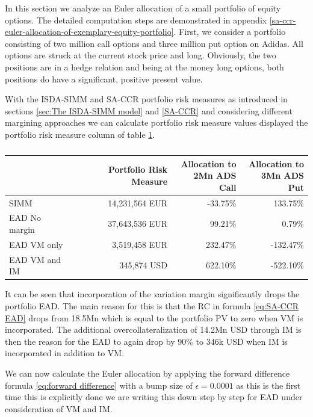 \documentclass[../Thesis_AHoecherl.tex]{subfiles}
\begin{document}
    In this section we analyze an Euler allocation of a small portfolio of equity options. The detailed computation steps are demonstrated in appendix \ref{sa-ccr-euler-allocation-of-exemplary-equity-portfolio}. 
    First, we consider a portfolio consisting of two million call options and three million put option on Adidas. All options are struck at the current stock price and long. Obviously, the two positions are in a hedge relation and being at the money long options, both positions do have a significant, positive present value.
    
    With the ISDA-SIMM and SA-CCR portfolio risk measures as introduced in sections \ref{sec:The ISDA-SIMM model} and \ref{SA-CCR} and considering different margining approaches we can calculate portfolio risk measure values displayed the portfolio risk measure column of table \ref{tab:2TradeEquityResults}.
    \begin{table}[htbp]
        \centering
        \begin{tabular}{l||r|r|r}
            & Portfolio Risk Measure & \makecell{Allocation to \\ 2Mn ADS Call} & \makecell{Allocation to \\ 3Mn ADS Put} \\
                \toprule
        SIMM  & 14,231,564 EUR & -33.75\% & 133.75\%  \\
        EAD No margin & 37,643,536 EUR & 99.21\% & 0.79\%  \\
        EAD VM only & 3,519,458 EUR & 232.47\% & -132.47\%  \\
        EAD VM and IM & 345,874 USD  & 622.10\% & -522.10\% \\
        \end{tabular}%
        \caption{}
        \label{tab:2TradeEquityResults}%
    \end{table}%
    It can be seen that incorporation of the variation margin significantly drops the portfolio EAD. The main reason for this is that the RC in formula \ref{eq:SA-CCR EAD} drops from 18.5Mn which is equal to the portfolio PV to zero when VM is incorporated.
    The additional overcollateralization of 14.2Mn USD through IM is then the reason for the EAD to again drop by 90\% to 346k USD when IM is incorporated in addition to VM.

    We can now calculate the Euler allocation by applying the forward difference formula \ref{eq:forward difference} with a bump size of $\epsilon = 0.0001$ as this is the first time this is explicitly done we are writing this down step by step for EAD under consideration of VM and IM.
\end{document}
